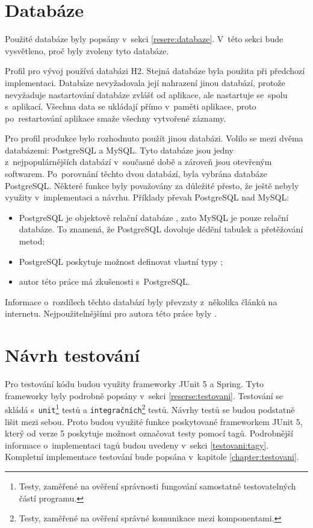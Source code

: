 \section{Databáze} \label{navrh:db}
    Použité databáze byly popsány v~sekci \ref{resere:databaze}. V~této sekci bude vysvětleno, proč byly zvoleny tyto databáze.
    
    Profil pro vývoj používá databázi H2. Stejná databáze byla použita při předchozí implementaci. Databáze nevyžadovala její nahrazení jinou databází, protože nevyžaduje nastartování databáze zvlášť od aplikace, ale nastartuje se~spolu s~aplikací. Všechna data se ukládají přímo v~paměti aplikace, proto po~restartování aplikace smaže všechny vytvořené záznamy.
    
    Pro profil produkce bylo rozhodnuto použít jinou databázi. Volilo se mezi dvěma databázemi: PostgreSQL a MySQL. Tyto databáze jsou jedny z~nejpopulárnějších databází v~současné době a zároveň jsou otevřeným softwarem. Po~porovnání těchto dvou databází, byla vybrána databáze PostgreSQL. Některé funkce byly považovány za důležité přesto, že ještě nebyly využity v~implementaci a návrhu. Příklady převah PostgreSQL nad MySQL: 
    \begin{itemize}
            \item PostgreSQL je objektově relační databáze \cite{postgres-about}, zato MySQL je pouze relační databáze. To znamená, že PostgreSQL dovoluje dědění tabulek a přetěžování metod;
            \item PostgreSQL poskytuje možnost definovat vlastní typy \cite{pstgres-create-type};
            \item autor této práce má zkušenosti s~PostgreSQL.
    \end{itemize}
    Informace o~rozdílech těchto databází byly převzaty z~několika článků na internetu. Nejpoužitelnějšími pro autora této práce byly \cite{mysql-postgres1, mysql-postgres2}.
    
    
\section{Návrh testování}\label{navrh:testovani}
    Pro testování kódu budou využity frameworky JUnit 5 a Spring. Tyto frameworky byly podrobně popsány v~sekci \ref{reserse:testovani}. Testování se skládá s~\texttt{unit}\footnote{Testy, zaměřené na ověření správnosti fungování samostatně testovatelných částí programu.} testů a \texttt{integračních}\footnote{Testy, zaměřené na ověření správné komunikace mezi komponentami.} testů. Návrhy testů se budou podstatně lišit mezi sebou. Proto budou využité funkce poskytované frameworkem JUnit 5, který od verze 5 poskytuje možnost označovat testy pomocí tagů.\cite{junit-tags} Podrobnější informace o~implementaci tagů budou uvedeny v~sekci \ref{testovani:tagy}. Kompletní implementace testování bude popsána v~kapitole \ref{chapter:testovani}.
    
